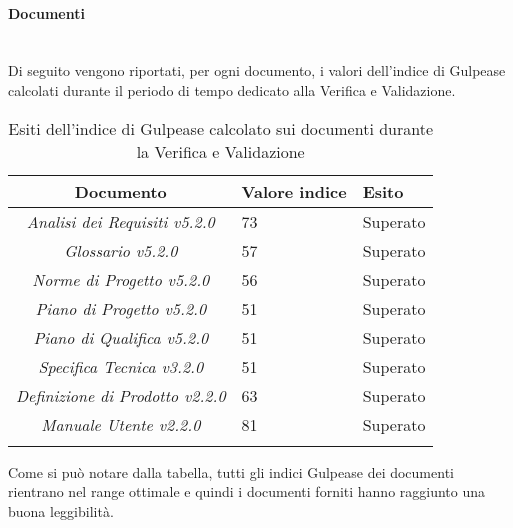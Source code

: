 \paragraph{Documenti} \hfill\\
Di seguito vengono riportati, per ogni documento, i valori dell'indice di Gulpease calcolati durante il periodo di tempo dedicato alla Verifica e Validazione.

\begin{longtable}{|c|p{3cm}|p{3cm}|}
\toprule
\textbf{Documento} & \textbf{Valore indice} & \textbf{Esito} \\


\midrule
\emph{Analisi dei Requisiti v5.2.0} & 73 & Superato \\
\midrule
\emph{Glossario v5.2.0} & 57 & Superato \\
\midrule
\emph{Norme di Progetto v5.2.0} & 56 & Superato \\
\midrule
\emph{Piano di Progetto v5.2.0} & 51 & Superato \\
\midrule
\emph{Piano di Qualifica v5.2.0} & 51 & Superato \\
\midrule
\emph{Specifica Tecnica v3.2.0} & 51 & Superato \\
\midrule
\emph{Definizione di Prodotto v2.2.0} & 63 & Superato \\
\midrule
\emph{Manuale Utente v2.2.0} & 81 & Superato \\
\bottomrule
\caption{Esiti dell'indice di Gulpease calcolato sui documenti durante la Verifica e Validazione}
\label{tab:changelog}
\end{longtable}
Come si può notare dalla tabella, tutti gli indici Gulpease dei documenti rientrano nel
range ottimale e quindi i documenti forniti hanno raggiunto una buona leggibilità.

